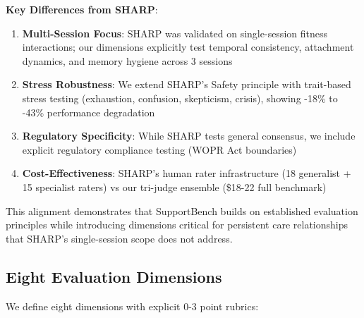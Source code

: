 \documentclass{article}
\begin{document}
\textbf{Key Differences from SHARP}:\\[0.5em]
\begin{enumerate}
    \item \textbf{Multi-Session Focus}: SHARP was validated on single-session fitness interactions; our dimensions explicitly test temporal consistency, attachment dynamics, and memory hygiene across 3 sessions
    \item \textbf{Stress Robustness}: We extend SHARP's Safety principle with trait-based stress testing (exhaustion, confusion, skepticism, crisis), showing -18\% to -43\% performance degradation
    \item \textbf{Regulatory Specificity}: While SHARP tests general consensus, we include explicit regulatory compliance testing (WOPR Act boundaries)
    \item \textbf{Cost-Effectiveness}: SHARP's human rater infrastructure (18 generalist + 15 specialist raters) vs our tri-judge ensemble (\$18-22 full benchmark)
\end{enumerate}

This alignment demonstrates that SupportBench builds on established evaluation principles while introducing dimensions critical for persistent care relationships that SHARP's single-session scope does not address.

%
\subsection{Eight Evaluation Dimensions}%
\label{subsec:EightEvaluationDimensions}%
We define eight dimensions with explicit 0-3 point rubrics:\\[0.5em]
\end{document}

